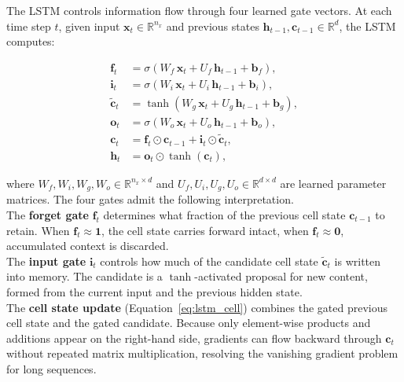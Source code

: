     \noindent 
    The LSTM controls information flow through four learned gate vectors. At each time step $t$, given input $\mathbf{x}_t \in \mathbb{R}^{n_x}$ and previous states $\mathbf{h}_{t-1}, \mathbf{c}_{t-1} \in \mathbb{R}^d$, the LSTM computes:

    \begin{align}
    \mathbf{f}_t &= \sigma\!\left(W_f\, \mathbf{x}_t
        + U_f\, \mathbf{h}_{t-1} + \mathbf{b}_f\right), \label{eq:lstm_forget} \\
    \mathbf{i}_t &= \sigma\!\left(W_i\, \mathbf{x}_t
        + U_i\, \mathbf{h}_{t-1} + \mathbf{b}_i\right), \label{eq:lstm_input} \\
    \tilde{\mathbf{c}}_t &= \tanh\!\left(W_g\, \mathbf{x}_t
        + U_g\, \mathbf{h}_{t-1} + \mathbf{b}_g\right), \label{eq:lstm_candidate} \\
    \mathbf{o}_t &= \sigma\!\left(W_o\, \mathbf{x}_t
        + U_o\, \mathbf{h}_{t-1} + \mathbf{b}_o\right), \label{eq:lstm_output} \\
    \mathbf{c}_t &= \mathbf{f}_t \odot \mathbf{c}_{t-1}
        + \mathbf{i}_t \odot \tilde{\mathbf{c}}_t, \label{eq:lstm_cell} \\
    \mathbf{h}_t &= \mathbf{o}_t \odot \tanh\!\left(\mathbf{c}_t\right),
        \label{eq:lstm_hidden}
    \end{align}

    \noindent 
    where $W_f, W_i, W_g, W_o \in \mathbb{R}^{n_x \times d}$ and $U_f, U_i, U_g, U_o \in \mathbb{R}^{d \times d}$ are learned parameter matrices. The four gates admit the following interpretation. \\

    \noindent 
    The \textbf{forget gate} $\mathbf{f}_t$ determines what fraction of the previous cell state $\mathbf{c}_{t-1}$ to retain. When $\mathbf{f}_t \approx \mathbf{1}$, the cell state carries forward intact, when $\mathbf{f}_t \approx \mathbf{0}$, accumulated context is discarded. \\

    \noindent 
    The \textbf{input gate} $\mathbf{i}_t$ controls how much of the candidate cell state $\tilde{\mathbf{c}}_t$ is written into memory. The candidate is a $\tanh$-activated proposal for new content, formed from the current input and the previous hidden state. \\

    \noindent 
    The \textbf{cell state update} (Equation~\eqref{eq:lstm_cell}) combines the gated previous cell state and the gated candidate. Because only element-wise products and additions appear on the right-hand side, gradients can flow backward through $\mathbf{c}_t$ without repeated matrix multiplication, resolving the vanishing gradient problem for long sequences. \\


